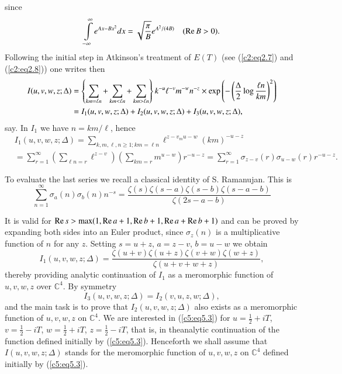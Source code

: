  since 
 $$
 \int\limits^\infty_{-\infty} e^{Ax -Bx^2} dx = \sqrt{\frac{\pi}{B}}
 e^{A^2/(4B)} \quad (\operatorname{Re} B > 0). 
 $$\pageoriginale
 Following the initial step in Atkinson's treatment of $E(T)$ (see (\ref{c2:eq2.7}) and (\ref{c2:eq2.8})) one writes then
{\fontsize{10pt}{12pt}\selectfont 
\begin{align}
 I(u,v,w,z;\Delta) & = \left\{ \sum\limits_{km = \ell n} +
 \sum\limits_{km< \ell n} + \sum\limits_{km > \ell n} \right\} k^{-u}
 \ell^{-v} m^{-w}  n^{-z}\times
\exp \left(- \left(\frac{\Delta}{2} \log
 \frac{\ell n}{ km} \right)^2 \right)\notag\\ 
 & = I_1 (u,v,w,z; \Delta) + I_2 (u,v,w,z;\Delta) + I_3 (u,v,w, z;\Delta),\label{c5:eq5.4}
 \end{align}}
 say. In $I_1$ we have $n=km/\ell$, hence
 \begin{align*}
& I_1(u,v,w,z;\Delta) = \sum\limits_{k,m,\ell, n \geq 1; km=\ell n} \ell^{z-v_m u-w} (km)^{-u-z}\\
& = \sum\limits^\infty_{r=1} \left(\sum\limits_{\ell n = r} \ell^{z-v} \right) \left(\sum\limits_{km=r} m^{u-w} \right) r^{-u-z} = \sum\limits^{\infty}_{r=1} \sigma_{z-v} (r) \sigma_{u-w} (r) r^{-u-z}.
 \end{align*}

 To evaluate the last series we recall a classical identity of
 S. Ramanujan. This is  
 \begin{equation}
 \sum\limits^\infty_{n=1} \sigma_a (n) \sigma_b (n) n^{-s} = \frac{\zeta(s) \zeta(s-a) \zeta (s-b) \zeta(s-a-b)}{\zeta(2s-a-b)}\label{c5:eq5.5}
 \end{equation}

 It is valid for $\operatorname{Re} s > \max (1, \operatorname{Re}  a+ 1, \operatorname{Re} b + 1, \operatorname{Re} a + \operatorname{Re} b + 1)$ and can be proved by expanding both sides into an Euler product, since $\sigma_z(n)$ is a multiplicative function of $n$ for any $z$. Setting $s = u +z$, $a = z - v$, $b = u - w$ we obtain
 \begin{equation}
 I_1(u,v,w,z;\Delta) = \frac{\zeta (u+v) \zeta (u+z) \zeta (v+w) \zeta
   (w+z)}{\zeta(u+v+w+z)}, \label{c5:eq5.6} 
\end{equation}
thereby providing analytic continuation of $I_1$ as a meromorphic
function of $u,v,w,z$ over $\mathbb{C}^4$. By symmetry 
 \begin{equation}
 I_3 (u,v,w,z;\Delta) = I_2 (v,u,z,w;\Delta),\label{c5:eq5.7} 
 \end{equation}
 and the main task is to prove that $I_2 (u,v,w,z;\Delta)$ also exists
 as a meromorphic function of $u,v,w,z$ on $\mathbb{C}^4$. We are
 interested in (\ref{c5:eq5.3}) for $u = \frac{1}{2} + i T$, $v =
 \frac{1}{2} - iT $, $w = \frac{1}{2} + iT$, $z = \frac{1}{2} - iT$,
 that is, in the\pageoriginale analytic continuation of the function
 defined initially by (\ref{c5:eq5.3}). Henceforth we shall assume
 that $I(u,v,w,z;\Delta)$ stands for the meromorphic function of
 $u,v,w,z$ on $\mathbb{C}^4$ defined initially by (\ref{c5:eq5.3}). 

